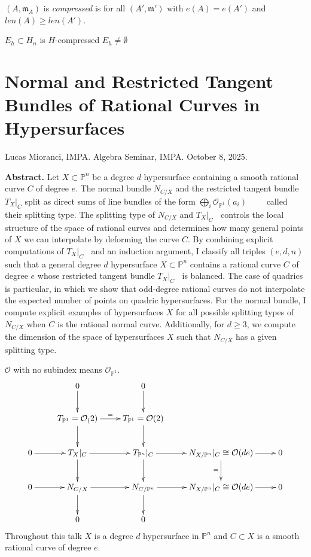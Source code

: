 \begin{definition}
\label{definition-compressed}
$(A,\mathfrak{m}_A)$ is {\it compressed} is
for all  $(A',\mathfrak{m}')$
with $e(A)=e(A')$ and $len(A) \geq  len(A')
$.
\end{definition}

\begin{theorem}
\label{theorem-E}
$E_h \subset H_n$ is $H$-compressed
$E_h \neq  \emptyset$
\end{theorem}

\section{Normal and Restricted Tangent
Bundles of Rational
Curves in Hypersurfaces}
\label{section-restricted-tangent-bundles}

\noindent
Lucas Mioranci, IMPA.
Algebra Seminar, IMPA.
October 8, 2025.

\medskip\noindent
{\bf Abstract.}
Let $X\subset \mathbb{P}^n$ be a degree $d$
hypersurface containing a smooth
rational curve $C$ of degree $e$. The normal
bundle $N_{C/X}$ and the restricted
tangent bundle $T_X|_C$ split as direct sums
of line bundles of the form
$\bigoplus_i
\mathcal{O}_{\mathbb{P}^1}(a_i)\qquad$ called
their splitting type.
The splitting type of $N_{C/X}$ and
${T_X}|_C\;\;$ controls the local structure
of the space of rational curves and
determines how many general points of $X$ we
can interpolate by deforming the curve $C$.
By combining explicit computations
of $T_X|_C\;\;$ and an induction argument, I
classify all triples $(e,d,n)$ such
that a general degree $d$ hypersurface
$X\subset \mathbb{P}^n$ contains a
rational curve $C$ of degree $e$ whose
restricted tangent bundle ${T_X}|_C\;\;$
is balanced. The case of quadrics is
particular, in which we show that
odd-degree rational curves do not interpolate
the expected number of points on
quadric hypersurfaces.  For the normal
bundle, I compute explicit examples of
hypersurfaces $X$ for all possible splitting
types of $N_{C/X}$ when $C$ is the
rational normal curve. Additionally, for
$d\ge 3$, we compute the dimension of
the space of hypersurfaces $X$ such that
$N_{C/X}$ has a given splitting type.



\medskip\noindent

$\mathcal{O}$ with no subindex means
$\mathcal{O}_{\mathbb{P}^1}$.
$$
\xymatrix{
&0\ar[d]&0\ar[d]\\
&T_{\mathbb{P}^1}=\mathcal{O}_(2)\ar[d]\ar[r]
^=
&T_{\mathbb{P}^1}=\mathcal{O}(2)\ar[d]\\
0\ar[r]&T_{X}|_{C}\ar[d]\ar[r]&T_{\mathbb{P}
^n}|_{C}\ar[d]\ar[r]&
N_{X/\mathbb{P}^n}|_{C}\cong
\mathcal{O}(de)\ar[d]_=\ar[r]&0\\
0\ar[r]&
N_{C/X}\ar[d]\ar[r]&N_{C/\mathbb{P}^n}\ar[d]
\ar[r]&
N_{X/\mathbb{P}^n}|_{C}\cong
\mathcal{O}(de)\ar[r]&0\\
&0&0
}
$$
Throughout this talk
$X$ is a degree $d$ hypersurface in
$\mathbb{P}^n$
and $C \subset X$ is a smooth rational curve
of degree $e$.

